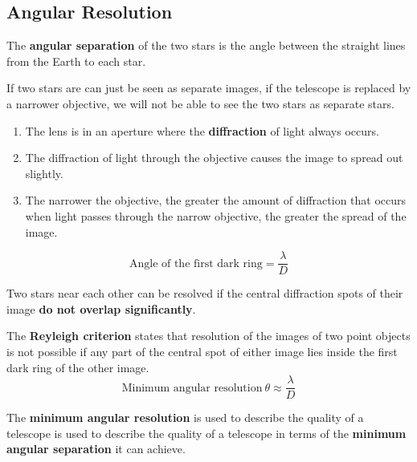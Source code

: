 \subsection{Angular Resolution}

The \textbf{angular separation} of the two stars is the angle between the straight lines from the Earth to each star.

If two stars are can just be seen as separate images, if the telescope is replaced by a narrower objective, we will not be able to see the two stars as separate stars.
\begin{enumerate}
    \item The lens is in an aperture where the \textbf{diffraction} of light always occurs.
    \item The diffraction of light through the objective causes the image to spread out slightly.
    \item The narrower the objective, the greater the amount of diffraction that occurs when light passes through the narrow objective, the greater the spread of the image.
\end{enumerate}
$$\text{Angle of the first dark ring}=\frac{\lambda}{D}$$

Two stars near each other can be resolved if the central diffraction spots of their image \textbf{do not overlap significantly}.

The \textbf{Reyleigh criterion} states that resolution of the images of two point objects is not possible if any part of the central spot of either image lies inside the first dark ring of the other image.
$$\text{Minimum angular resolution}\ \theta\approx\frac{\lambda}{D}$$

The \textbf{minimum angular resolution} is used to describe the quality of a telescope is used to describe the quality of a telescope in terms of the \textbf{minimum angular separation} it can achieve.
